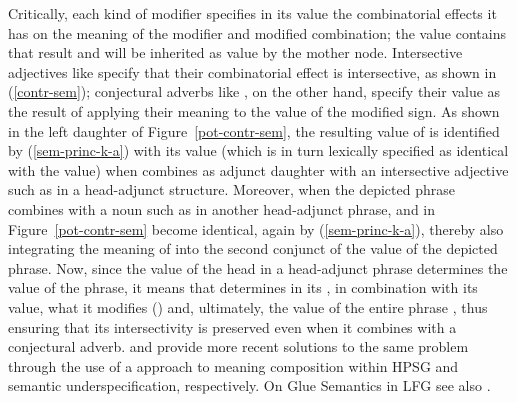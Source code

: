 \documentclass[output=paper,biblatex,babelshorthands,newtxmath,draftmode,colorlinks,citecolor=brown]{langscibook}
\begin{document}
\begin{exe}
\ex\label{pot-sem}

\end{exe}

\pagebreak

Critically, each kind of modifier specifies in its  value the combinatorial
effects it has on the meaning of the modifier and modified combination; the  value
contains that result and will be inherited as  value by the mother node. Intersective
adjectives like  specify that their combinatorial effect is intersective, as
shown in (\ref{contr-sem}); conjectural adverbs like , on the other hand, specify
their  value as the result of applying their meaning to the  value of the
modified sign. As shown in the left daughter of Figure~\ref{pot-contr-sem}, the resulting
 value of  is identified by (\ref{sem-princ-k-a}) with its
 value (which is in turn lexically specified as identical with the 
value) when  combines as adjunct daughter with an intersective adjective such as
 in a head-adjunct structure. Moreover, when the depicted phrase
 combines with a noun such as  in another head-adjunct
phrase,  and  in Figure~\ref{pot-contr-sem} become identical, again by
(\ref{sem-princ-k-a}), thereby also integrating the meaning of  into
the second conjunct of the  value of the depicted phrase. Now, since the
 value of the head in a head-adjunct phrase determines the  value of the
phrase, it means that  determines in its , in combination with its
 value, what it modifies () and, ultimately, the  value of the
entire phrase , thus ensuring that its intersectivity is
preserved even when it combines with a conjectural adverb. \citet{AsudehandCrouch2002} and
\citet{Egg2004a} provide more recent solutions to the same problem through the use of a  approach to meaning composition within HPSG and semantic underspecification,
respectively. On Glue Semantics in LFG see also .
\end{document}

